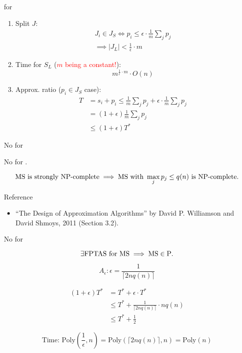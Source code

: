\begin{frame}{\ptas{} for \ms{}}
  \begin{enumerate}
	\item Split $J$:
	  \begin{gather*}
		J_i \in J_{S} \iff p_i \le \epsilon \cdot \frac{1}{m} \sum_{j} p_j \\
		\implies |J_L| < \frac{1}{\epsilon} \cdot m
	  \end{gather*}
	\item Time for $S_L$ (\textcolor{red}{$m$ being a constant!}):
	  \[
		m^{\frac{1}{\epsilon} \cdot m} \cdot O(n)
	  \]
	\item Approx. ratio ($p_i \in J_{S}$ case):
	  \begin{align*}
		T &= s_i + p_i \le \frac{1}{m} \sum_{j} p_j + \epsilon \cdot \frac{1}{m} \sum_{j} p_j \\
		&= (1 + \epsilon) \frac{1}{m} \sum_{j} p_j \\
		&\le (1 + \epsilon) T^{\ast}
	  \end{align*}
  \end{enumerate}
\end{frame}
\begin{frame}{No \fptas{} for \ms{}}
  \begin{theorem}[$\ms \in \ptas \setminus \fptas$]
	No \fptas{} for \ms{}.
  \end{theorem}

  \[
	\text{MS}{} \text{ is strongly } \text{NP-complete}{} \implies \text{MS}{} \text{ with } \max_{j} p_j \le q(n) \text{ is } \text{NP-complete}{}.
  \]

  \begin{alertblock}{Reference}
	\begin{itemize}
	  \item ``The Design of Approximation Algorithms'' by David P. Williamson and David Shmoys, 2011 ({\small Section 3.2}).
	\end{itemize}
  \end{alertblock}
\end{frame}
\begin{frame}{No \fptas{} for \ms{}}
  \begin{theorem}[]
	\[
	  \exists \text{FPTAS}{} \text{ for } \text{MS}{} \implies \text{MS} \in \text{P}{}.
	\]
  \end{theorem}

  \[
	A_{\epsilon}: \epsilon = \frac{1}{\lceil 2n q(n) \rceil}
  \]

  \begin{align*}
	(1 + \epsilon) T^{\ast} &= T^{\ast} + \epsilon \cdot T^{\ast} \\
	&\le T^{\ast} + \frac{1}{\lceil 2n q(n) \rceil} \cdot n q(n) \\
	&\le T^{\ast} + \frac{1}{2}
  \end{align*}

  \[
	\text{Time: } \text{Poly}(\frac{1}{\epsilon}, n) = \text{Poly}(\lceil 2n q(n) \rceil, n) = \text{Poly}(n)
  \]
\end{frame}
